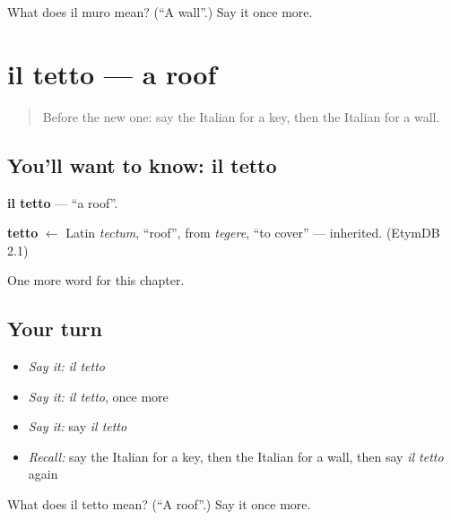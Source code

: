 \begin{tcolorbox}[breakable,colback=teal!4,colframe=teal!35!black,title={Before you move on}]
What does il muro mean? (\textquotedblleft{}A wall\textquotedblright{}.) Say it once more.
\end{tcolorbox}
\section[il tetto]{il tetto — a roof}

\label{lesson:IT-C57-tetto}



\begin{quote}
Before the new one: say the Italian for a key, then the Italian for a wall.
\end{quote}

\subsection*{You'll want to know: il tetto}
\textbf{il tetto} — \textquotedblleft{}a roof\textquotedblright{}.

\begin{cousinweb}
\textbf{tetto} $\leftarrow$ Latin \emph{tectum}, \textquotedblleft{}roof\textquotedblright{}, from \emph{tegere}, \textquotedblleft{}to cover\textquotedblright{} — inherited. (EtymDB 2.1)
\end{cousinweb}

\begin{grammarlens}[title={What you've built}]
One more word for this chapter.
\end{grammarlens}

\subsection*{Your turn}
\begin{itemize}
\raggedright
  \item \emph{Say it:} \emph{il tetto}
  \item \emph{Say it:} \emph{il tetto}, once more
  \item \emph{Say it:} say \emph{il tetto}
  \item \emph{Recall:} say the Italian for a key, then the Italian for a wall, then say \emph{il tetto} again
\end{itemize}

\begin{tcolorbox}[breakable,colback=teal!4,colframe=teal!35!black,title={Before you move on}]
What does il tetto mean? (\textquotedblleft{}A roof\textquotedblright{}.) Say it once more.
\end{tcolorbox}

